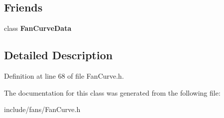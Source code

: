 \subsection*{Friends}
\begin{DoxyCompactItemize}
\item 
\mbox{\label{class_fan_curve_data_1_1_base_operating_point_a84779ae1f4b93a96435593980fe1445b}} 
class {\bfseries Fan\+Curve\+Data}
\end{DoxyCompactItemize}


\subsection{Detailed Description}


Definition at line 68 of file Fan\+Curve.\+h.



The documentation for this class was generated from the following file\+:\begin{DoxyCompactItemize}
\item 
include/fans/Fan\+Curve.\+h\end{DoxyCompactItemize}
